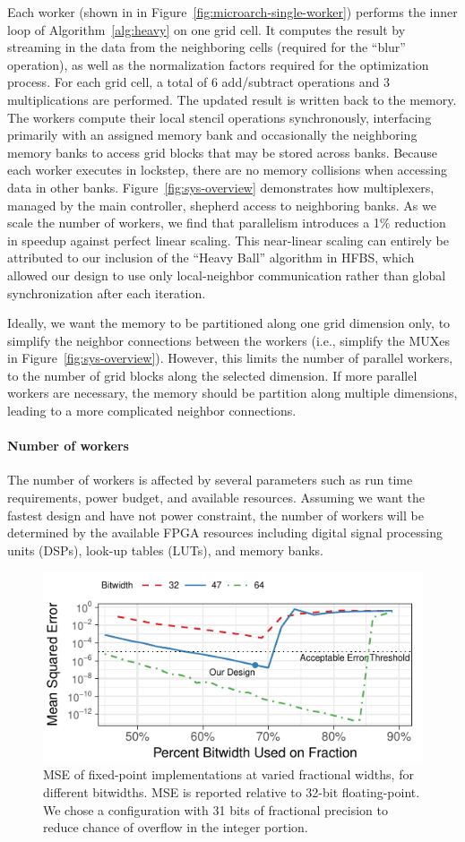 Each worker (shown in in Figure~\ref{fig:microarch-single-worker}) performs the inner loop of Algorithm~\ref{alg:heavy} on one grid cell. 
It computes the result by streaming in the data from the neighboring cells (required for the ``blur'' operation), as well as the normalization factors required for the optimization process. 
For each grid cell, a total of 6 add/subtract operations and 3 multiplications are performed. The updated result is written back to the memory. 
The workers compute their local stencil operations synchronously, interfacing primarily with an assigned memory bank and occasionally the neighboring memory banks to access grid blocks that may be stored across banks.
Because each worker executes in lockstep, there are no memory collisions when accessing data in other banks.  
Figure~\ref{fig:sys-overview} demonstrates how multiplexers, managed by the main controller, shepherd access to neighboring banks.  
As we scale the number of workers, we find that parallelism introduces a 1\% reduction in speedup against perfect linear scaling. 
This near-linear scaling can entirely be attributed to our inclusion of the ``Heavy Ball'' algorithm in HFBS, which allowed our design to use only local-neighbor communication rather than global synchronization after each iteration.


Ideally, we want the memory to be partitioned along one grid dimension only, to simplify the neighbor connections between the workers (i.e., simplify the MUXes in Figure~\ref{fig:sys-overview}). 
However, this limits the number of parallel workers, to the number of grid blocks along the selected dimension. 
If more parallel workers are necessary, the memory should be partition along multiple dimensions, leading to a more complicated neighbor connections.



\paragraph{Number of workers}
The number of workers is affected by several parameters such as run time requirements, power budget, and available resources. Assuming we want the fastest design and have not power constraint, the number of workers will be determined by the available FPGA resources including digital signal processing units (DSPs), look-up tables (LUTs), and memory banks. 

  \begin{figure}[h]
		\centering
		\includegraphics[width=.5\columnwidth]{hfbs-figs/fixed_point.pdf}
		\caption{MSE of fixed-point implementations at varied fractional widths, for different bitwidths. MSE is reported relative to 32-bit floating-point. We chose a configuration with 31 bits of fractional precision to reduce chance of overflow in the integer portion.}
		\label{fig:fixed-point}
  \end{figure}

